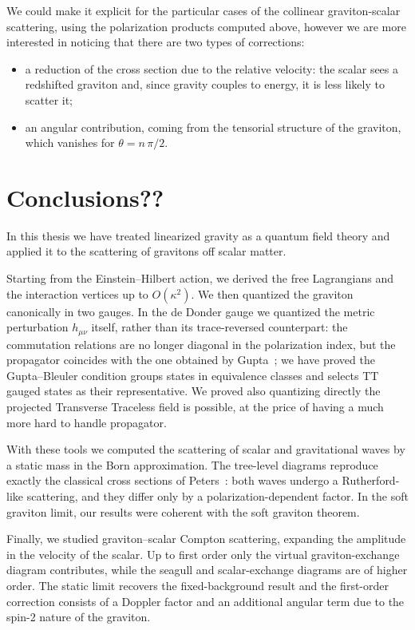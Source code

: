 \documentclass[12pt,a4paper,oneside]{article}
\numberwithin{equation}{section}   %
\begin{document}
We could make it explicit for the particular
cases of the collinear graviton-scalar scattering,
 using the polarization products computed above, however we 
 are more interested in noticing that there are two types of corrections:
\begin{itemize}
    \item a reduction of the cross section due to the relative velocity: the
    scalar sees a redshifted graviton and, since gravity couples to energy, it
    is less likely to scatter it;
    \item an angular contribution, coming from the tensorial structure of the
    graviton, which vanishes for $\theta=n\,\pi/2$.
\end{itemize}

\newpage
\section{Conclusions??}

In this thesis we have treated linearized gravity as a quantum field theory and
applied it to the scattering of gravitons off scalar matter.

Starting from the Einstein--Hilbert action, we derived the free Lagrangians and
the interaction vertices up to $O(\kappa^2)$. We then quantized the graviton
canonically in two gauges. In the de Donder gauge we quantized the metric
perturbation $h_{\mu\nu}$ itself, rather than its trace-reversed counterpart:
the commutation relations are no longer diagonal in the polarization index,
but the propagator coincides with the one obtained by Gupta~\cite{Gupta1952};
we have proved the Gupta--Bleuler condition groups states in equivalence classes
and selects TT gauged states as their representative.
We proved also quantizing directly the projected Transverse Traceless
field is possible, at the price of having a much more hard to handle propagator.


With these tools we computed the scattering of scalar and gravitational waves
by a static mass in the Born approximation.
 The tree-level diagrams reproduce exactly the classical
cross sections of Peters~\cite{Peters1976}: 
both waves undergo a Rutherford-like scattering, and
they differ only by a polarization-dependent factor. In the soft
graviton limit, our results were coherent with the soft graviton theorem.

Finally, we studied graviton--scalar Compton scattering, expanding the
amplitude in the velocity of the scalar. Up to first order only the virtual
graviton-exchange diagram contributes, while the seagull and scalar-exchange
diagrams are of higher order. The static limit recovers the fixed-background
result and the first-order correction consists of a Doppler factor and an additional
angular term due to the spin-2 nature of the graviton.
\end{document}
